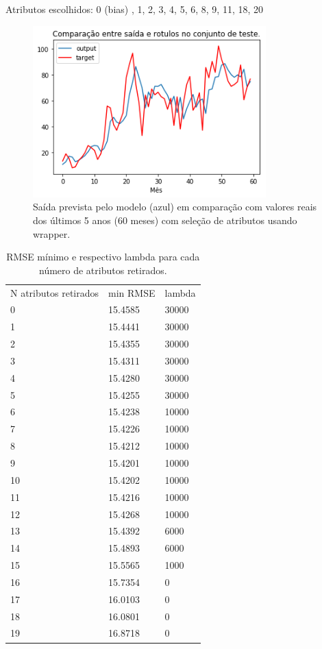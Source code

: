 \documentclass[a4paper, 12pt]{article}
\begin{document}
Atributos escolhidos: 0 (bias) , 1, 2, 3, 4, 5, 6, 8, 9, 11, 18, 20

\begin{figure}[h!]
    \centering
    \includegraphics[width=9cm]{images/wrapper.png}
    \caption{Saída prevista pelo modelo (azul) em comparação com valores reais dos últimos 5 anos (60 meses) com seleção de atributos usando wrapper.}
\end{figure}

\begin{table}[]
    \centering
    \caption{RMSE mínimo e respectivo lambda para cada número de atributos retirados.}
\begin{tabular}{lll}
N atributos retirados & min RMSE & lambda \\
0                     & 15.4585 & 30000 \\
1                     & 15.4441 & 30000 \\
2                     & 15.4355 & 30000 \\
3                     & 15.4311 & 30000 \\
4                     & 15.4280 & 30000 \\
5                     & 15.4255 & 30000 \\
6                     & 15.4238 & 10000 \\
7                     & 15.4226 & 10000 \\
8                     & 15.4212 & 10000 \\
9                     & 15.4201 & 10000 \\
10                    & 15.4202 & 10000 \\
11                    & 15.4216 & 10000 \\
12                    & 15.4268 & 10000 \\
13                    & 15.4392 & 6000  \\
14                    & 15.4893 & 6000  \\
15                    & 15.5565 & 1000  \\
16                    & 15.7354 & 0     \\
17                    & 16.0103 & 0     \\
18                    & 16.0801 & 0     \\
19                    & 16.8718 & 0
\end{tabular}
\end{table}
\end{document}
